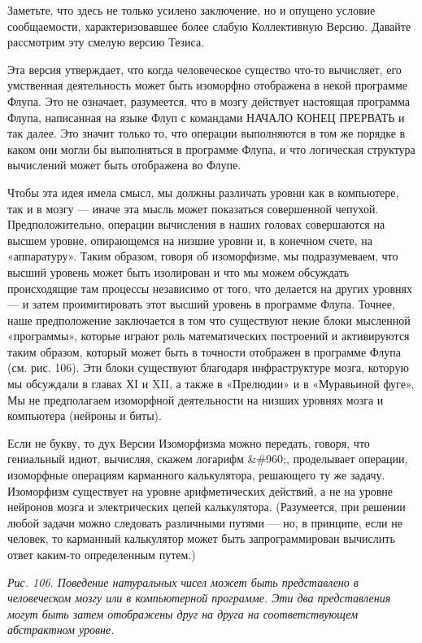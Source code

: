 \documentclass[../main.tex]{subfiles}
\begin{document}
Заметьте, что здесь не только усилено заключение, но и опущено условие сообщаемости, характеризовавшее более слабую Коллективную Версию. Давайте рассмотрим эту смелую версию Тезиса.

Эта версия утверждает, что когда человеческое существо что-то вычисляет, его умственная деятельность может быть изоморфно отображена в некой программе Флупа. Это не означает, разумеется, что в мозгу действует настоящая программа Флупа, написанная на языке Флуп с командами НАЧАЛО КОНЕЦ ПРЕРВАТЬ и так далее. Это значит только то, что операции выполняются в том же порядке в каком они могли бы выполняться в программе Флупа, и что логическая структура вычислений может быть отображена во Флупе.

Чтобы эта идея имела смысл, мы должны различать уровни как в компьютере, так и в мозгу --- иначе эта мысль может показаться совершенной чепухой. Предположительно, операции вычисления в наших головах совершаются на высшем уровне, опирающемся на низшие уровни и, в конечном счете, на «аппаратуру». Таким образом, говоря об изоморфизме, мы подразумеваем, что высший уровень может быть изолирован и что мы можем обсуждать происходящие там процессы независимо от того, что делается на других уровнях --- и затем проимитировать этот высший уровень в программе Флупа. Точнее, наше предположение заключается в том что существуют некие блоки мысленной «программы», которые играют роль математических построений и активируются таким образом, который может быть в точности отображен в программе Флупа (см. рис. 106). Эти блоки существуют благодаря инфраструктуре мозга, которую мы обсуждали в главах ХI и XII, а также в «Прелюдии» и в «Муравьиной фуге». Мы не предполагаем изоморфной деятельности на низших уровнях мозга и компьютера (нейроны и биты).

Если не букву, то дух Версии Изоморфизма можно передать, говоря, что гениальный идиот, вычисляя, скажем логарифм \&\#960;, проделывает операции, изоморфные операциям карманного калькулятора, решающего ту же задачу. Изоморфизм существует на уровне арифметических действий, а не на уровне нейронов мозга и электрических цепей калькулятора. (Разумеется, при решении любой задачи можно следовать различными путями --- но, в принципе, если не человек, то карманный калькулятор может быть запрограммирован вычислить ответ каким-то определенным путем.)

\emph{Рис. 106. Поведение натуральных чисел может быть представлено в человеческом мозгу или в компьютерной программе. Эти два представления могут быть затем отображены друг на друга на соответствующем абстрактном уровне.}
\end{document}
